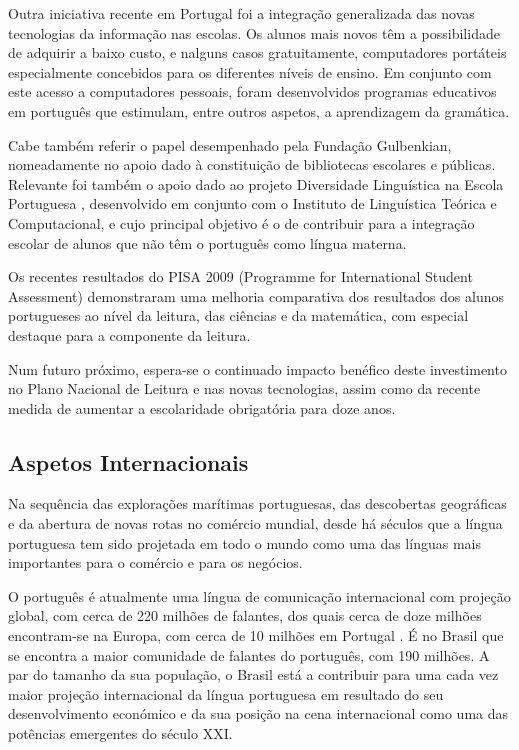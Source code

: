 \begin{multicols}{2}
Outra iniciativa recente em Portugal foi a integração generalizada das novas tecnologias da informação nas escolas.
Os alunos mais novos têm a possibilidade de adquirir a baixo custo, e nalguns casos gratuitamente, 
computadores portáteis especialmente concebidos para os diferentes níveis de ensino. 
Em conjunto com este acesso a computadores pessoais, foram desenvolvidos programas educativos em português que estimulam, entre outros aspetos, a aprendizagem da gramática.


Cabe também referir o papel desempenhado pela Fundação Gulbenkian, nomeadamente no apoio dado à constituição de bibliotecas escolares e públicas. 
Relevante foi também o apoio dado ao projeto Diversidade Linguística na Escola Portuguesa \cite{gulbenkian2}, desenvolvido em conjunto com o Instituto de Linguística Teórica e Computacional, e cujo principal objetivo é o de contribuir para a integração escolar de alunos que não têm o português como língua materna.

Os recentes resultados do PISA 2009 (Programme for International Student Assessment) demonstraram uma melhoria comparativa dos resultados dos alunos portugueses ao nível da leitura, das ciências e da matemática, com especial destaque para a componente da leitura. 

Num futuro próximo, espera-se o continuado impacto benéfico deste investimento no Plano Nacional de Leitura e nas novas tecnologias, assim como da recente medida de aumentar a escolaridade obrigatória para doze anos.

\subsection{Aspetos Internacionais}

Na sequência das explorações marítimas portuguesas, das descobertas geográficas e da abertura de novas rotas no comércio mundial, 
desde há séculos que a língua portuguesa tem sido projetada em todo o mundo como uma das línguas mais importantes para o comércio e 
para os negócios.

O português é atualmente uma língua de comunicação internacional com projeção global, com cerca de 220 milhões de falantes, dos quais cerca de doze milhões encontram-se na Europa, com cerca de 10 milhões em Portugal \cite{census}. É no Brasil que se encontra a maior comunidade de falantes do português, com 190 milhões. 
A par do tamanho da sua população, o Brasil está a contribuir para uma cada vez maior projeção internacional da língua portuguesa em resultado do seu desenvolvimento económico e da sua posição na cena internacional como uma das potências emergentes do século XXI.


\end{multicols}
